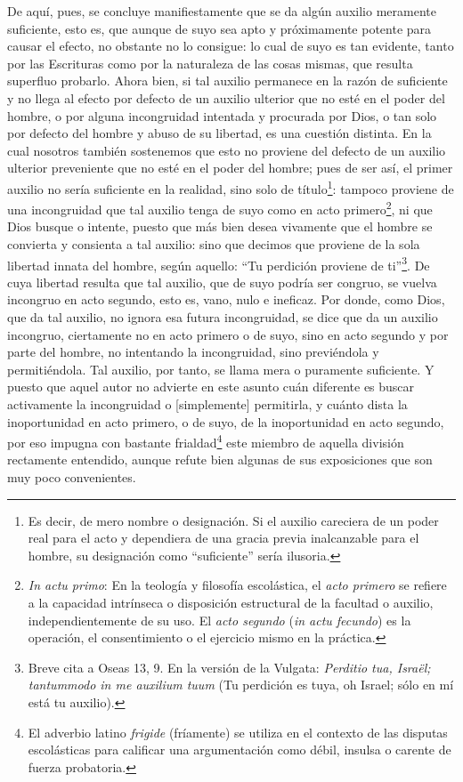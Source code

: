 \documentclass{article}
\begin{document}
De aquí, pues, se concluye manifiestamente que se da algún auxilio meramente suficiente,
esto es, que aunque de suyo sea apto y próximamente potente para causar el efecto, no
obstante no lo consigue: lo cual de suyo es tan evidente, tanto por las Escrituras como
por la naturaleza de las cosas mismas, que resulta superfluo probarlo. Ahora bien, si
tal auxilio permanece en la razón de suficiente y no llega al efecto por defecto de un
auxilio ulterior que no esté en el poder del hombre, o por alguna incongruidad intentada
y procurada por Dios, o tan solo por defecto del hombre y abuso de su libertad, es una
cuestión distinta. En la cual nosotros también sostenemos que esto no proviene del
defecto de un auxilio ulterior preveniente que no esté en el poder del hombre; pues de
ser así, el primer auxilio no sería suficiente en la realidad, sino solo de
título\footnote{Es decir, de mero nombre o designación. Si el auxilio careciera de un
poder real para el acto y dependiera de una gracia previa inalcanzable para el hombre,
su designación como \enquote{suficiente} sería ilusoria.}: tampoco proviene de una
incongruidad que tal auxilio tenga de suyo como en acto primero\footnote{\textit{In actu
primo}: En la teología y filosofía escolástica, el \textit{acto primero} se refiere a la
capacidad intrínseca o disposición estructural de la facultad o auxilio,
independientemente de su uso. El \textit{acto segundo} (\textit{in actu fecundo}) es la
operación, el consentimiento o el ejercicio mismo en la práctica.}, ni que Dios busque o
intente, puesto que más bien desea vivamente que el hombre se convierta y consienta a
tal auxilio: sino que decimos que proviene de la sola libertad innata del hombre, según
aquello: \enquote{Tu perdición proviene de ti}\footnote{Breve cita a Oseas 13, 9. En la
versión de la Vulgata: \textit{Perditio tua, Israël; tantummodo in me auxilium tuum} (Tu
perdición es tuya, oh Israel; sólo en mí está tu auxilio).}. De cuya libertad resulta
que tal auxilio, que de suyo podría ser congruo, se vuelva incongruo en acto segundo,
esto es, vano, nulo e ineficaz. Por donde, como Dios, que da tal auxilio, no ignora esa
futura incongruidad, se dice que da un auxilio incongruo, ciertamente no en acto primero
o de suyo, sino en acto segundo y por parte del hombre, no intentando la incongruidad,
sino previéndola y permitiéndola. Tal auxilio, por tanto, se llama mera o puramente
suficiente. Y puesto que aquel autor no advierte en este asunto cuán diferente es buscar
activamente la incongruidad o [simplemente] permitirla, y cuánto dista la inoportunidad
en acto primero, o de suyo, de la inoportunidad en acto segundo, por eso impugna con
bastante frialdad\footnote{El adverbio latino \textit{frigide} (fríamente) se utiliza en
el contexto de las disputas escolásticas para calificar una argumentación como débil,
insulsa o carente de fuerza probatoria.} este miembro de aquella división rectamente
entendido, aunque refute bien algunas de sus exposiciones que son muy poco convenientes.
\end{document}
